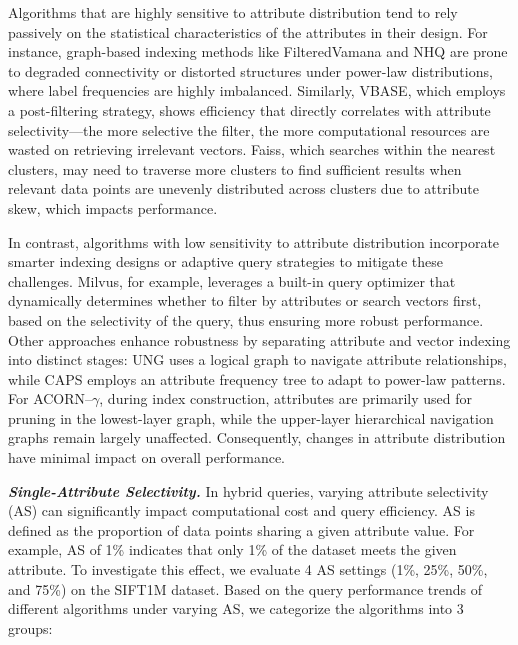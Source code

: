 \documentclass[sigconf, nonacm, pdfa]{acmart}
\begin{document}
{	Algorithms that are highly sensitive to attribute distribution tend to rely passively on the statistical characteristics of the attributes in their design. For instance, graph-based indexing methods like FilteredVamana and NHQ are prone to degraded connectivity or distorted structures under power-law distributions, where label frequencies are highly imbalanced. Similarly, VBASE, which employs a post-filtering strategy, shows efficiency that directly correlates with attribute selectivity—the more selective the filter, the more computational resources are wasted on retrieving irrelevant vectors. Faiss, which searches within the nearest clusters, may need to traverse more clusters to find sufficient results when relevant data points are unevenly distributed across clusters due to attribute skew, which impacts performance.

	In contrast, algorithms with low sensitivity to attribute distribution incorporate smarter indexing designs or adaptive query strategies to mitigate these challenges. Milvus, for example, leverages a built-in query optimizer that dynamically determines whether to filter by attributes or search vectors first, based on the selectivity of the query, thus ensuring more robust performance. Other approaches enhance robustness by separating attribute and vector indexing into distinct stages: UNG uses a logical graph to navigate attribute relationships, while CAPS employs an attribute frequency tree to adapt to power-law patterns. For ACORN--\(\gamma\), during index construction, attributes are primarily used for pruning in the lowest-layer graph, while the upper-layer hierarchical navigation graphs remain largely unaffected. Consequently, changes in attribute distribution have minimal impact on overall performance.
		

	
	\textit{\textbf{Single-Attribute Selectivity.}}
	In hybrid queries, varying attribute selectivity (AS) can significantly impact computational cost and query efficiency.
	AS is defined as the proportion of data points sharing a given attribute value. For example, AS of 1\% indicates that only 1\% of the dataset meets the given attribute. 
	To investigate this effect, we evaluate 4 AS settings (1\%, 25\%, 50\%, and 75\%) on the SIFT1M dataset. 
	Based on the query performance trends of different algorithms under varying AS, we categorize the algorithms into 3 groups:

}
\end{document}
